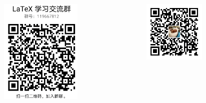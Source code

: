 \documentclass{libs/SUSTech_format}
\begin{document}
{\begin{frame}{}
\begin{columns}
            \begin{figure}
                \includegraphics[width=0.8\textwidth]{latex_qq_group.png}
            \end{figure}

            \begin{figure}
                \includegraphics[width=0.8\textwidth]{my-wx.jpg}
            \end{figure}
        \end{columns}

    \end{frame}
}
\end{document}
